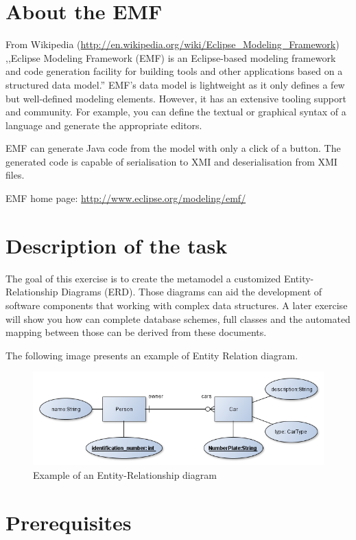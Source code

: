 \documentclass[]{report}
\let\Oldincludegraphics\includegraphics
\renewcommand{\includegraphics}[1]{
\begin{adjustbox}{max size={\textwidth}{\textheight}}
    \Oldincludegraphics[scale=0.6]{#1}%
\end{adjustbox}
}
\begin{document}
\section{About the EMF}

From Wikipedia
(\url{http://en.wikipedia.org/wiki/Eclipse_Modeling_Framework})
,,Eclipse Modeling Framework (EMF) is an Eclipse-based modeling
framework and code generation facility for building tools and other
applications based on a structured data model.'' EMF's data model is
lightweight as it only defines a few but well-defined modeling elements.
However, it has an extensive tooling support and community. For example,
you can define the textual or graphical syntax of a language and
generate the appropriate editors.

EMF can generate Java code from the model with only a click of a button.
The generated code is capable of serialisation to XMI and
deserialisation from XMI files.

EMF home page: \url{http://www.eclipse.org/modeling/emf/}

\section{Description of the task}

The goal of this exercise is to create the metamodel a customized
Entity-Relationship Diagrams (ERD). Those diagrams can aid the
development of software components that working with complex data
structures. A later exercise will show you how can complete database
schemes, full classes and the automated mapping between those can be
derived from these documents.

The following image presents an example of Entity Relation diagram.

\begin{figure}[htbp]
\centering
\includegraphics{img/emf/ERD1.png}
\caption{Example of an Entity-Relationship diagram}
\end{figure}

\section{Prerequisites}
\end{document}
